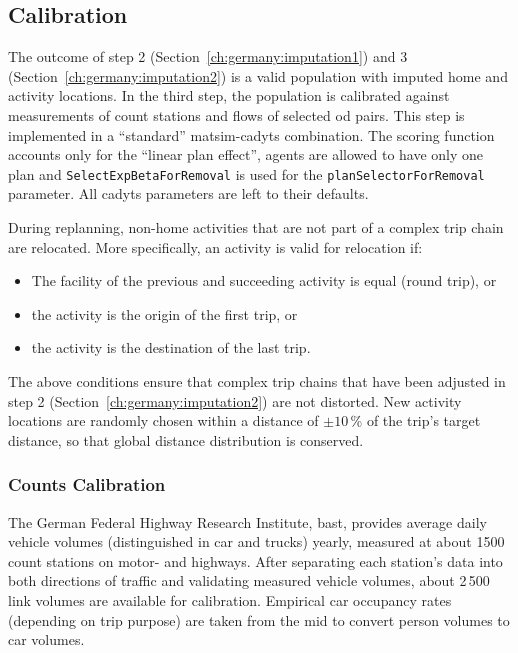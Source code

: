 \subsection{Calibration}

The outcome of step 2 (Section~\ref{ch:germany:imputation1}) and 3 (Section~\ref{ch:germany:imputation2}) is a valid population with imputed home and activity locations. In the third step, the population is calibrated against measurements of count stations and flows of selected \gls{od} pairs. This step is implemented in a ``standard'' \gls{matsim}-\gls{cadyts} combination. The scoring function accounts only for the ``linear plan effect'', agents are allowed to have only one plan and \lstinline|SelectExpBetaForRemoval| is used for the \lstinline|planSelectorForRemoval| parameter. All \gls{cadyts} parameters are left to their defaults.

During replanning, non-home activities that are not part of a complex trip chain are relocated. More specifically, an activity is valid for relocation if:
\begin{itemize}
\item The facility of the previous and succeeding activity is equal (round trip), or
\item the activity is the origin of the first trip, or
\item the activity is the destination of the last trip.
\end{itemize}
The above conditions ensure that complex trip chains that have been adjusted in step 2 (Section~\ref{ch:germany:imputation2}) are not distorted. New activity locations are randomly chosen within a distance of $\pm10$\,\% of the trip's target distance, so that global distance distribution is conserved.

\subsubsection{Counts Calibration}

The German Federal Highway Research Institute, \gls{bast}, provides average daily vehicle volumes (distinguished in car and trucks) yearly, measured at about 1500 count stations on motor- and highways. After separating each station's data into both directions of traffic and validating measured vehicle volumes, about 2\,500\,link volumes are available for calibration. Empirical car occupancy rates (depending on trip purpose) are taken from the \gls{mid} to convert person volumes to car volumes.

